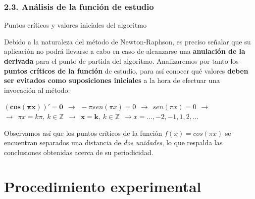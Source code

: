 \documentclass{beamer}
\begin{document}

\begin{frame}
\frametitle{2.3. Análisis de la función de estudio}
\begin{block}{Puntos críticos y valores iniciales del algoritmo}

Debido a la naturaleza del método de Newton-Raphson, es preciso señalar que su aplicación no podrá
llevarse a cabo en caso de alcanzarse una \textbf{anulación de la derivada} para el punto de partida 
del algoritmo. \pause Analizaremos por tanto los \textbf{puntos críticos de la función} de estudio, 
para así conocer qué valores \textbf{deben ser evitados como suposiciones iniciales} a la hora de 
efectuar una invocación al método: \pause
    \begin{center}
    $\boldsymbol{(cos (\pi x))' = 0} \ \ \to \ \ -\pi sen (\pi x) = 0 \ \ \to \ \ sen (\pi x) = 0 \ \ \to$ 
    $\to\ \ \pi x = k \pi, \ k \in \mathbb{Z} \ \ \to \ \ \boldsymbol{x = k}, \ k \in \mathbb{Z} \ \ \to x = 
    ..., -2, -1, 1, 2, ...$
    \end{center}

\pause
Observamos así que los puntos críticos de la función $f(x) = cos (\pi x)$ se encuentran separados
una distancia de \emph{dos unidades}, lo que respalda las conclusiones obtenidas acerca de su 
periodicidad.

\end{block}
\end{frame}


\section{Procedimiento experimental}

\end{document}
